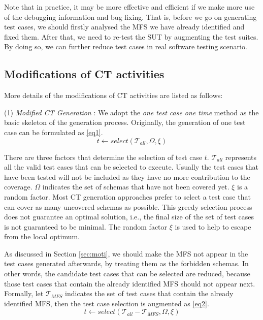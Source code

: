 \documentclass[10pt,journal,compsoc]{IEEEtran}
\begin{document}
Note that in practice, it may be more effective and efficient if we make more use of the debugging information and bug fixing. That is, before we go on generating test cases, we should firstly analysed the MFS we have already identified and fixed them. After that, we need to re-test the SUT by augmenting the test suites. By doing so, we can further reduce test cases in real software testing scenario.

\subsection{Modifications of CT activities}\label{sec:app:modi}
More details of the modifications of CT activities are listed as follows:

(1) \emph{Modified CT Generation} :
We adopt the \emph{one test case one time} method as the basic skeleton of the generation process. Originally, the generation of one test case can be formulated as \ref{eq1}.
\begin{displaymath} t \leftarrow  select (\mathcal{T}_{all}, \Omega ,  \xi) \tag{EQ1} \label{eq1} \end{displaymath}

There are three factors that determine the selection of test case $t$. $\mathcal{T}_{all}$ represents all the valid test cases that can be selected to execute. Usually the test cases that have been tested will not be included as they have no more contribution to the coverage. $\Omega$ indicates the set of schemas that have not been covered yet. $\xi$ is a random factor. Most CT generation approaches prefer to select a test case that can cover as many uncovered schemas as possible. This greedy selection process does not guarantee an optimal solution, i.e., the final size of the set of test cases is not guaranteed to be minimal. The random factor $\xi$ is used to help to escape from the local optimum.



As discussed in Section \ref{sec:moti}, we should make the MFS not appear in the test cases generated afterwards, by treating them as the forbidden schemas. In other words, the candidate test cases that can be selected are reduced, because those test cases that contain the already identified MFS should not appear next. Formally,  let $\mathcal{T}_{MFS}$ indicates the set of test cases that contain the already identified MFS, then the test case selection is augmented as \ref{eq2}.
\begin{displaymath} t \leftarrow  select (\mathcal{T}_{all} - \mathcal{T}_{MFS}, \Omega ,  \xi ) \tag{EQ2} \label{eq2} \end{displaymath}
\end{document}
